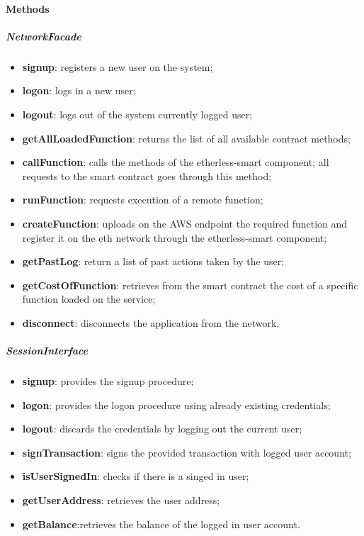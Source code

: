 \paragraph{Methods}
\subparagraph{NetworkFacade}
\begin{itemize}
    \item \textbf{signup}: registers a new user on the system;
    \item \textbf{logon}: logs in a new user;
    \item \textbf{logout}: logs out of the system currently logged user;
	\item \textbf{getAllLoadedFunction}: returns the list of all available contract methods;
    \item \textbf{callFunction}: calls the methods of the etherless-smart component; all requests to the smart contract goes through this method;
    \item \textbf{runFunction}: requests execution of a remote function;
    \item \textbf{createFunction}: uploads on the AWS endpoint the required function and register it on the eth network through the etherless-smart component;
    \item \textbf{getPastLog}: return a list of past actions taken by the user;
    \item \textbf{getCostOfFunction}: retrieves from the smart contract the cost of a specific function loaded on the service;
    \item \textbf{disconnect}: disconnects the application from the network.
\end{itemize}
\subparagraph{SessionInterface}
\begin{itemize}
    \item \textbf{signup}: provides the signup procedure;
    \item \textbf{logon}: provides the logon procedure using already existing credentials;
    \item \textbf{logout}: discards the credentials by logging out the current user;
    \item \textbf{signTransaction}: signs the provided transaction with logged user account;
    \item \textbf{isUserSignedIn}: checks if there is a singed in user;
    \item \textbf{getUserAddress}: retrieves the user address;
    \item \textbf{getBalance}:retrieves the balance of the logged in user account.
\end{itemize}
